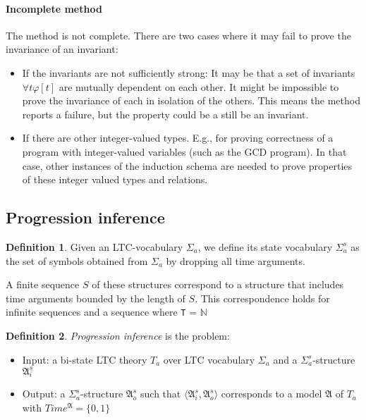 \documentclass[10pt,a4paper]{article}
\theoremstyle{definition}
\newtheorem{definition}{Definition}[section]
\begin{document}
\paragraph{Incomplete method} The method is not complete. There are two cases where it may fail to prove the invariance of an invariant:
\begin{itemize} 
	\item If the invariants are not sufficiently strong:  It may be that a set of invariants $\forall t \varphi[t]$ are mutually dependent on each other. It might be impossible to prove the invariance of each in isolation of the others. This means the method reports a failure, but the property could be a still be an invariant. 
	\item If there are other integer-valued types. E.g., for proving correctness of a program with integer-valued variables (such as the GCD program). In that case, other instances of the induction schema are needed to prove properties of these integer valued types and relations.
\end{itemize}

\subsection{Progression inference}

\begin{definition}
Given an LTC-vocabulary $\Sigma_a$, we define its state vocabulary $\Sigma^s_a$ as the set of
symbols obtained from $\Sigma_a$ by dropping all time arguments.
\end{definition}

A finite sequence $S$ of these structures correspond to a structure that includes time arguments bounded by the length of $S$. This correspondence holds for infinite sequences and a sequence where \texttt{T} = $\mathbb{N}$

\begin{definition}
\textit{Progression inference} is the problem:
\begin{itemize}
	\item Input: a bi-state LTC theory $T_a$ over LTC vocabulary $\Sigma_a$ and a $\Sigma^s_a$-structure $\mathfrak{A}^s_i$ 
	\item Output: a $\Sigma^s_a$-structure $\mathfrak{A}^s_o$ such that $\langle \mathfrak{A}^s_i , \mathfrak{A}^s_o \rangle$ corresponds to a model $\mathfrak{A}$ of $T_a$ with $Time^\mathfrak{A} = \{0,1\}$
\end{itemize}
\end{definition}
\end{document}
